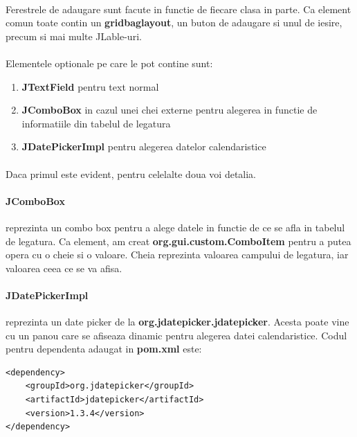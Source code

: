 \documentclass[oneside]{article}
\begin{document}
\paragraph{} Ferestrele de adaugare sunt facute in functie de fiecare clasa in parte. Ca element comun toate contin un \textbf{gridbaglayout}, un buton de adaugare si unul de iesire, precum si mai multe JLable-uri.

\paragraph{} Elementele optionale pe care le pot contine sunt:
\begin{enumerate}
    \item \textbf{JTextField} pentru text normal
    \item \textbf{JComboBox} in cazul unei chei externe pentru alegerea in functie de informatiile din tabelul de legatura
    \item \textbf{JDatePickerImpl} pentru alegerea datelor calendaristice
\end{enumerate}

\paragraph{} Daca primul este evident, pentru celelalte doua voi detalia.

\paragraph{JComboBox} reprezinta un combo box pentru a alege datele in functie de ce se afla in tabelul de legatura. Ca element, am creat \textbf{org.gui.custom.ComboItem} pentru a putea opera cu o cheie si o valoare. Cheia reprezinta valoarea campului de legatura, iar valoarea ceea ce se va afisa.

\paragraph{JDatePickerImpl} reprezinta un date picker de la \textbf{org.jdatepicker.jdatepicker}. Acesta poate vine cu un panou care se afiseaza dinamic pentru alegerea datei calendaristice. Codul pentru dependenta adaugat in \textbf{pom.xml} este:
\begin{center}
    \begin{lstlisting}[language=pom]
<dependency>
    <groupId>org.jdatepicker</groupId>
    <artifactId>jdatepicker</artifactId>
    <version>1.3.4</version>
</dependency>
    \end{lstlisting}
\end{center}
\end{document}
